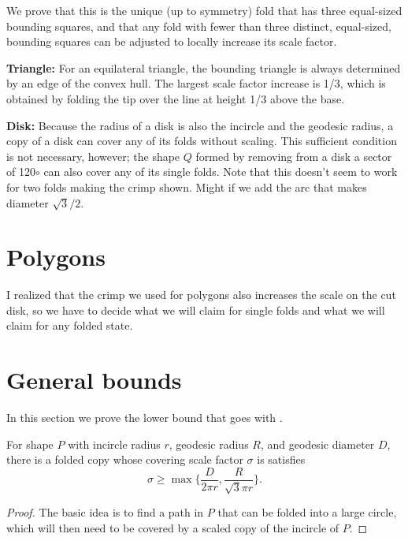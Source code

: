 \documentclass[11pt]{article}
\begin{document}
We prove  that this is the unique (up to
symmetry) fold that has three equal-sized bounding squares, and that
any fold with fewer than three distinct, equal-sized, bounding squares
can be adjusted to locally increase its scale factor.



 {\bf Triangle:\/} For an equilateral triangle, the bounding triangle is always
determined by an edge of the convex hull.  The largest scale factor
increase is 1/3, which is obtained by folding the tip over the line at
height 1/3 above the base.  



 {\bf Disk:\/} 
Because the radius of a disk is also the incircle and the geodesic radius, 
a copy of a disk can cover any of its folds without scaling.  This sufficient
condition is not necessary, however; the shape $Q$ formed by removing
from a disk a sector of 120$\circ$ can also cover any of its single folds.
 Note that this doesn't seem to
  work for two folds making the crimp shown.  Might if we add the arc that makes diameter
  $\sqrt 3/2$.

\section{Polygons}
I realized that the crimp we used for polygons also increases the
scale on the cut disk, so we have to decide what we will claim for
single folds and what we will claim for any folded state. 
  
\section{General bounds}\label{sec:genl}

In this section we prove the lower bound that goes with .
\begin{lemma}\label{lem:lb}
For shape $P$ with incircle radius $r$, geodesic radius $R$, and
geodesic diameter $D$, there is a folded copy whose covering scale
factor $\sigma$ is satisfies $$\sigma\ge \max\{\frac{D}{2\pi
  r},\frac{R}{\sqrt 3\pi r}\}.$$
\end{lemma}
\begin{proof}
The basic idea is to find a path in $P$ that can be folded into a
large circle, which will then need to be covered by a scaled copy of
the incircle of $P$. 

\end{proof}
\end{document}

